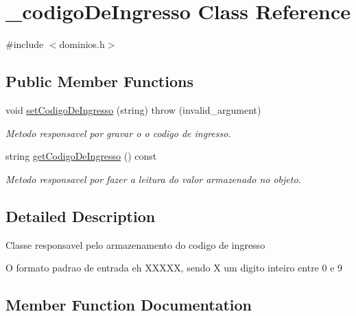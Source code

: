\hypertarget{class__codigo_de_ingresso}{}\section{\+\_\+codigo\+De\+Ingresso Class Reference}
\label{class__codigo_de_ingresso}


{\ttfamily \#include $<$dominios.\+h$>$}

\subsection*{Public Member Functions}
\begin{DoxyCompactItemize}
\item 
void \mbox{\hyperlink{class__codigo_de_ingresso_a7674d910334b1d7e41cd792856770630}{set\+Codigo\+De\+Ingresso}} (string)  throw (invalid\+\_\+argument)
\begin{DoxyCompactList}\small\item\em Metodo responsavel por gravar o o codigo de ingresso. \end{DoxyCompactList}\item 
string \mbox{\hyperlink{class__codigo_de_ingresso_a36614aca28c37bcda09378b61ca1dae2}{get\+Codigo\+De\+Ingresso}} () const
\begin{DoxyCompactList}\small\item\em Metodo responsavel por fazer a leitura do valor armazenado no objeto. \end{DoxyCompactList}\end{DoxyCompactItemize}


\subsection{Detailed Description}
Classe responsavel pelo armazenamento do codigo de ingresso

O formato padrao de entrada eh X\+X\+X\+XX, sendo X um digito inteiro entre 0 e 9 

\subsection{Member Function Documentation}
\mbox{\label{class__codigo_de_ingresso_a36614aca28c37bcda09378b61ca1dae2}} 
